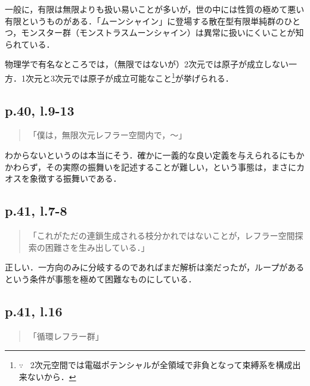 \documentclass[10pt, a5paper, twoside]{jsarticle}
\theoremstyle{definition}
\begin{document}
                一般に，有限は無限よりも扱い易いことが多いが，世の中には性質の極めて悪い有限というものがある．「ムーンシャイン」に登場する散在型有限単純群のひとつ，モンスター群（モンストラスムーンシャイン）は異常に扱いにくいことが知られている．

                物理学で有名なところでは，（無限ではないが）2次元では原子が成立しない一方．1次元と3次元では原子が成立可能なこと\footnote{$\because$ \ 2次元空間では電磁ポテンシャルが全領域で非負となって束縛系を構成出来ないから．}が挙げられる．

            \subsection{p.40, l.9-13}

                \begin{quote}

                    「僕は，無限次元レフラー空間内で，〜」

                \end{quote}

                わからないというのは本当にそう．確かに一義的な良い定義を与えられるにもかかわらず，その実際の振舞いを記述することが難しい，という事態は，まさにカオスを象徴する振舞いである．

            \subsection{p.41, l.7-8}

                \begin{quote}

                    「これがただの連鎖生成される枝分かれではないことが，レフラー空間探索の困難さを生み出している．」

                \end{quote}

                正しい．一方向のみに分岐するのであればまだ解析は楽だったが，ループがあるという条件が事態を極めて困難なものにしている．

            \subsection{p.41, l.16}

                \begin{quote}

                    「循環レフラー群」

                \end{quote}
\end{document}

